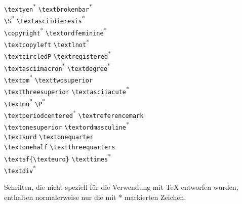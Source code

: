 {\begin{tabbing}
\textyen \> \verb+\textyen+\textsuperscript{*} \> \textbrokenbar \> \verb+\textbrokenbar+\textsuperscript{*} \\
\textsection \> \verb+\S+\textsuperscript{*}  \> \textasciidieresis \> \verb+\textasciidieresis+\textsuperscript{*} \\
\textcopyright \> \verb+\copyright+\textsuperscript{*} \> \textordfeminine \> \verb+\textordfeminine+\textsuperscript{*} \\
\textcopyleft \> \verb+\textcopyleft+ \> \textlnot \> \verb+\textlnot+\textsuperscript{*} \\
\textcircledP \> \verb+\textcircledP+ \> \textregistered \> \verb+\textregistered+\textsuperscript{*} \\
\textasciimacron \> \verb+\textasciimacron+\textsuperscript{*}  \> \textdegree \> \verb+\textdegree+\textsuperscript{*} \\
\textpm \> \verb+\textpm+\textsuperscript{*} \> \texttwosuperior \> \verb+\texttwosuperior+\\
\textthreesuperior \> \verb+\textthreesuperior+ \> \textasciiacute \> \verb+\textasciiacute+\textsuperscript{*} \\
\textmu \> \verb+\textmu+\textsuperscript{*} \> \textparagraph \> \verb+\P+\textsuperscript{*} \\
\textperiodcentered \> \verb+\textperiodcentered+\textsuperscript{*} \> \textreferencemark \> \verb+\textreferencemark+\\
\textonesuperior \> \verb+\textonesuperior+ \> \textordmasculine \> \verb+\textordmasculine+\textsuperscript{*} \\
\textsurd \> \verb+\textsurd+ \> \textonequarter \> \verb+\textonequarter+\\
\textonehalf \> \verb+\textonehalf+ \> \textthreequarters \> \verb+\textthreequarters+\\
\textsf{\texteuro} \> \verb+\textsf{\texteuro}+ \> \texttimes \> \verb+\texttimes+\textsuperscript{*} \\
\textdiv \> \verb+\textdiv+\textsuperscript{*} \\
\end{tabbing}
}

{\footnotesize\noindent 
Schriften, die nicht speziell für die Verwendung mit
\TeX{} entworfen wurden, enthalten normalerweise nur die mit * markierten Zeichen.
\par}


\endinput

